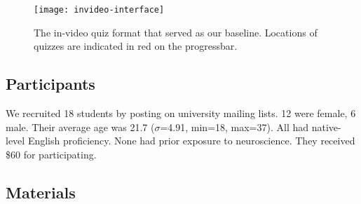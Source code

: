 \documentclass{sigchi}
\begin{document}
\begin{figure}
\centering
\texttt{[image: invideo-interface]}
\caption{The in-video quiz format that served as our baseline. Locations of quizzes are indicated in red on the progressbar.}
\label{fig:invideo-interface}
\end{figure}



\subsection{Participants}

We recruited 18  students by posting on university mailing lists. 12 were female, 6 male. Their average age was 21.7 ($\sigma$=4.91, min=18, max=37). All had native-level English proficiency. None had prior exposure to neuroscience.  They received \$60 for participating. %

\subsection{Materials}


\end{document}
